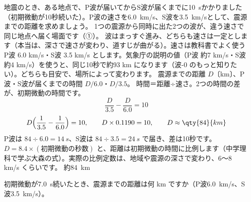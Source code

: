 \label{ph:波-5:ex6}
\begin{phreidai}[初期微動から震源までの距離]
地震のとき、ある地点で、P波が届いてからS波が届くまでに\qty{10}{s}かかりました（初期微動が10秒続いた）。P波の速さを\qty{6.0}{km/s}、S波を\qty{3.5}{km/s}として、震源までの距離を求めましょう。
\phbamen
1つの震源から同時に出た2つの波が、違う速さで同じ地点へ届く場面です（①）。
\phmushi
波はまっすぐ進み、どちらも速さは一定とします（本当は、深さで速さが変わり、道すじが曲がる）。速さは教科書でよく使う P波 6.0 km/s・S波 3.5 km/s とします。気象庁の説明の値（P波 約7 km/s・S波 約4 km/s）を使うと、同じ10秒で約93 km になります（波-0 のもっと知りたい）。どちらも目安で、場所によって変わります。
\phzu
震源までの距離 $D$〔km〕、P波・S波が届くまでの時間 $D/6.0$・$D/3.5$。
\phriyu
時間＝距離÷速さ。2つの時間の差が、初期微動の時間です。
\phtateru
\[\frac{D}{3.5}-\frac{D}{6.0}=10\]
\phtoku
\[D\Bigl(\frac{1}{3.5}-\frac{1}{6.0}\Bigr)=10,\qquad D\times0.1190=10,\qquad D\approx\qty{84}{km}\]
\phtashikame
P波は $84\div6.0=\qty{14}{s}$、S波は $84\div3.5=\qty{24}{s}$ で届き、差は10秒です。$D=8.4\times(\text{初期微動の秒数})$ と、距離は初期微動の時間に比例します（中学理科で学ぶ大森の式）。実際の比例定数は、地域や震源の深さで変わり、6〜8 km/s くらいです。
\kotae 約\qty{84}{km}
\end{phreidai}
\begin{jibun}
初期微動が\qty{7.0}{s}続いたとき、震源までの距離は何 km ですか（P波\qty{6.0}{km/s}、S波\qty{3.5}{km/s}）。
\end{jibun}

